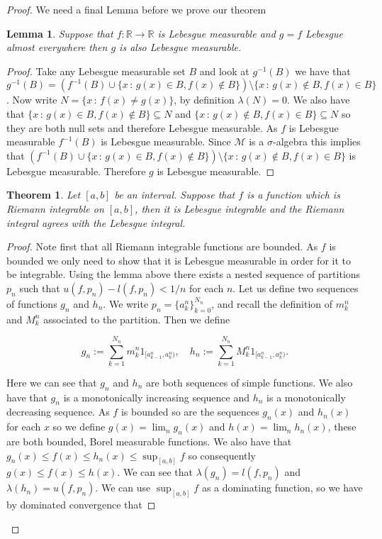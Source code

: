 \documentclass[
]{book}
\newtheorem{theorem}{Theorem}[chapter]
\newtheorem{lemma}{Lemma}[chapter]
\theoremstyle{definition}
\theoremstyle{definition}
\theoremstyle{definition}
\theoremstyle{definition}
\theoremstyle{remark}
\begin{document}
\begin{proof}
We need a final Lemma before we prove our theorem

\begin{lemma}
Suppose that \(f: \mathbb{R} \rightarrow \mathbb{R}\) is Lebesgue measurable and \(g = f\) Lebesgue almost everywhere then \(g\) is also Lebesgue measurable.
\end{lemma}

\begin{proof}
Take any Lebesgue measurable set \(B\) and look at \(g^{-1}(B)\) we have that \(g^{-1}(B) = (f^{-1}(B) \cup \{ x\,:\, g(x) \in B, f(x) \notin B\}) \setminus \{ x \, :\, g(x) \notin B, f(x) \in B\}\). Now write \(N = \{ x \,:\, f(x) \neq g(x)\}\), by definition \(\lambda(N) = 0\). We also have that \(\{ x \,:\, g(x) \in B, f(x) \notin B\} \subseteq N\) and \(\{x\,:\, g(x) \notin B, f(x) \in B\} \subseteq N\) so they are both null sets and therefore Lebesgue measurable. As \(f\) is Lebesgue measurable \(f^{-1}(B)\) is Lebesgue measurable. Since \(\mathscr{M}\) is a \(\sigma\)-algebra this implies that \((f^{-1}(B) \cup \{ x\,:\, g(x) \in B, f(x) \notin B\}) \setminus \{ x \, :\, g(x) \notin B, f(x) \in B\}\) is Lebesgue measurable. Therefore \(g\) is Lebesgue measurable.
\end{proof}

\begin{theorem}
Let \([a,b]\) be an interval. Suppose that \(f\) is a function which is Riemann integrable on \([a,b]\), then it is Lebesgue integrable and the Riemann integral agrees with the Lebesgue integral.
\end{theorem}

\begin{proof}
Note first that all Riemann integrable functions are bounded. As \(f\) is bounded we only need to show that it is Lebesgue measurable in order for it to be integrable.
Using the lemma above there exists a nested sequence of partitions \(p_n\) such that \(u(f,p_n) - l(f,p_n) < 1/n\) for each \(n\). Let us define two sequences of functions \(g_n\) and \(h_n\). We write \(p_n = \{ a^n_k \}_{k=0}^{N_n}\), and recall the definition of \(m^n_k\) and \(M^n_k\) associated to the partition. Then we define

\[ g_n:= \sum_{k=1}^{N_n} m^n_k 1_{[a_{k-1}^n, a_k^n)}, \quad h_n :=\sum_{k=1}^{N_n} M^n_k 1_{[a_{k-1}^n, a_k^n)}.\]

Here we can see that \(g_n\) and \(h_n\) are both sequences of simple functions. We also have that \(g_n\) is a monotonically increasing sequence and \(h_n\) is a monotonically decreasing sequence. As \(f\) is bounded so are the sequences \(g_n(x)\) and \(h_n(x)\) for each \(x\) so we define \(g(x) = \lim_n g_n(x)\) and \(h(x) = \lim_n h_n(x)\), these are both bounded, Borel measurable functions. We also have that \(g_n(x) \leq f(x) \leq h_n(x) \leq \sup_{[a,b]} f\) so consequently \(g(x) \leq f(x) \leq h(x)\). We can see that \(\lambda(g_n) = l(f,p_n)\) and \(\lambda(h_n) = u(f,p_n)\). We can use \(\sup_{[a,b]}f\) as a dominating function, so we have by dominated convergence that


\end{proof}
\end{proof}
\end{document}
